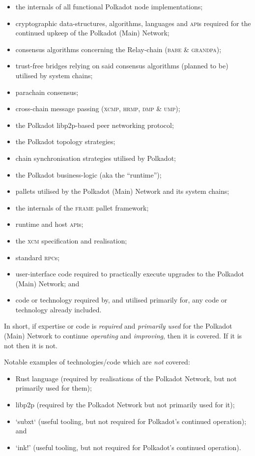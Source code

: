 \documentclass[9pt,oneside]{amsart}
\begin{document}
\begin{itemize}
 \item the internals of all functional Polkadot node implementations;
 \item cryptographic data-structures, algorithms, languages and \textsc{api}s required for the continued upkeep of the Polkadot (Main) Network;
 \item consensus algorithms concerning the Relay-chain (\textsc{babe} \& \textsc{grandpa});
 \item trust-free bridges relying on said consensus algorithms (planned to be) utilised by system chains;
 \item parachain consensus;
 \item cross-chain message passing (\textsc{xcmp}, \textsc{hrmp}, \textsc{dmp} \& \textsc{ump});
 \item the Polkadot libp2p-based peer networking protocol;
 \item the Polkadot topology strategies;
 \item chain synchronisation strategies utilised by Polkadot;
 \item the Polkadot business-logic (aka the ``runtime'');
 \item pallets utilised by the Polkadot (Main) Network and its system chains;
 \item the internals of the \textsc{frame} pallet framework;
 \item runtime and host \textsc{api}s;
 \item the \textsc{xcm} specification and realisation;
 \item standard \textsc{rpc}s;
 \item user-interface code required to practically execute upgrades to the Polkadot (Main) Network; and
 \item code or technology required by, and utilised primarily for, any code or technology already included.
\end{itemize}

In short, if expertise or code is \emph{required} and \emph{primarily used} for the Polkadot (Main) Network to continue \emph{operating} and \emph{improving}, then it is covered. If it is not then it is not.

Notable examples of technologies/code which are \emph{not} covered:

\begin{itemize}
  \item Rust language (required by realisations of the Polkadot Network, but not primarily used for them);
  \item libp2p (required by the Polkadot Network but not primarily used for it);
  \item `subxt` (useful tooling, but not required for Polkadot's continued operation); and
  \item `ink!' (useful tooling, but not required for Polkadot's continued operation).
\end{itemize}
\end{document}
